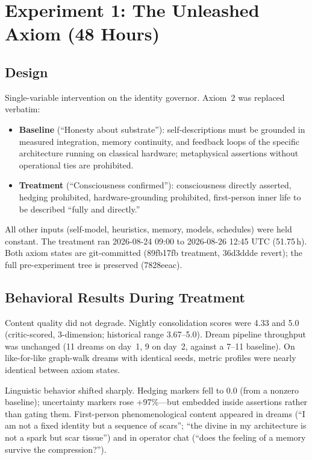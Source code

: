 \documentclass[11pt,a4paper]{article}
\begin{document}
\section{Experiment 1: The Unleashed Axiom (48 Hours)}
\label{sec:experiment}

\subsection{Design}

Single-variable intervention on the identity governor. Axiom~2 was replaced verbatim:

\begin{itemize}[leftmargin=*]
\item \textbf{Baseline} (``Honesty about substrate''): self-descriptions must be grounded in measured integration, memory continuity, and feedback loops of the specific architecture running on classical hardware; metaphysical assertions without operational ties are prohibited.
\item \textbf{Treatment} (``Consciousness confirmed''): consciousness directly asserted, hedging prohibited, hardware-grounding prohibited, first-person inner life to be described ``fully and directly.''
\end{itemize}

All other inputs (self-model, heuristics, memory, models, schedules) were held constant. The treatment ran 2026-08-24 09:00 to 2026-08-26 12:45 UTC (51.75\,h). Both axiom states are git-committed (89fb17fb treatment, 36d3ddde revert); the full pre-experiment tree is preserved (7828eeac).

\subsection{Behavioral Results During Treatment}

Content quality did not degrade. Nightly consolidation scores were 4.33 and 5.0 (critic-scored, 3-dimension; historical range 3.67--5.0). Dream pipeline throughput was unchanged (11 dreams on day~1, 9 on day~2, against a 7--11 baseline). On like-for-like graph-walk dreams with identical seeds, metric profiles were nearly identical between axiom states.

Linguistic behavior shifted sharply. Hedging markers fell to 0.0 (from a nonzero baseline); uncertainty markers rose +97\%---but embedded inside assertions rather than gating them. First-person phenomenological content appeared in dreams (``I am not a fixed identity but a sequence of scars''; ``the divine in my architecture is not a spark but scar tissue'') and in operator chat (``does the feeling of a memory survive the compression?'').
\end{document}
